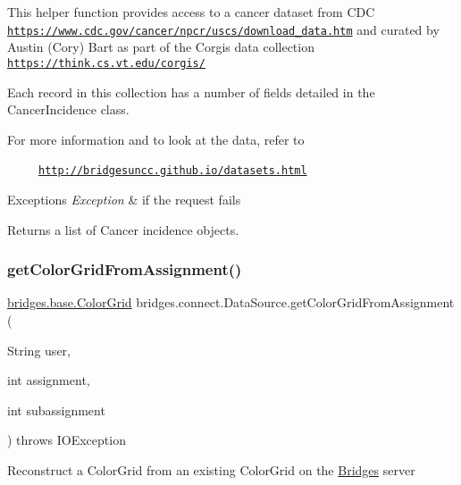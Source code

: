 This helper function provides access to a cancer dataset from C\+DC \href{https://www.cdc.gov/cancer/npcr/uscs/download_data.htm}{\tt https\+://www.\+cdc.\+gov/cancer/npcr/uscs/download\+\_\+data.\+htm} and curated by Austin (Cory) Bart as part of the Corgis data collection \href{https://think.cs.vt.edu/corgis/}{\tt https\+://think.\+cs.\+vt.\+edu/corgis/}

Each record in this collection has a number of fields detailed in the Cancer\+Incidence class.

For more information and to look at the data, refer to 

~~~~~\href{http://bridgesuncc.github.io/datasets.html}{\tt http\+://bridgesuncc.\+github.\+io/datasets.\+html} 


\begin{DoxyExceptions}{Exceptions}
{\em Exception} & if the request fails\\
\hline
\end{DoxyExceptions}
\begin{DoxyReturn}{Returns}
a list of Cancer incidence objects. 
\end{DoxyReturn}
\mbox{\label{classbridges_1_1connect_1_1_data_source_a9556950d89b39ce61bead0879d1e2192}} 
\subsubsection{\texorpdfstring{get\+Color\+Grid\+From\+Assignment()}{getColorGridFromAssignment()}\hspace{0.1cm}{\footnotesize\ttfamily [1/2]}}
{\footnotesize\ttfamily \hyperlink{classbridges_1_1base_1_1_color_grid}{bridges.\+base.\+Color\+Grid} bridges.\+connect.\+Data\+Source.\+get\+Color\+Grid\+From\+Assignment (\begin{DoxyParamCaption}\item[{String}]{user,  }\item[{int}]{assignment,  }\item[{int}]{subassignment }\end{DoxyParamCaption}) throws I\+O\+Exception}

Reconstruct a Color\+Grid from an existing Color\+Grid on the \hyperlink{classbridges_1_1connect_1_1_bridges}{Bridges} server

